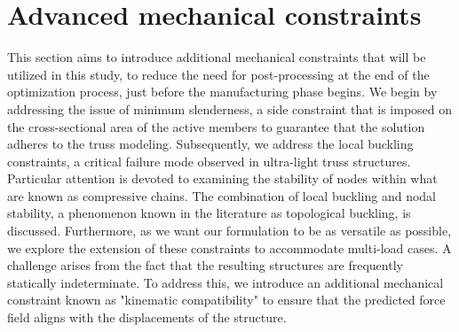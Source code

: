 \section{Advanced mechanical constraints} \label{sec:04_constr}
This section aims to introduce additional mechanical constraints that will be utilized in this study, to reduce the need for post-processing at the end of the optimization process, just before the manufacturing phase begins. We begin by addressing the issue of minimum slenderness, a side constraint that is imposed on the cross-sectional area of the active members to guarantee that the solution adheres to the truss modeling. Subsequently, we address the local buckling constraints, a critical failure mode observed in ultra-light truss structures. Particular attention is devoted to examining the stability of nodes within what are known as compressive chains. The combination of local buckling and nodal stability, a phenomenon known in the literature as topological buckling, is discussed. Furthermore, as we want our formulation to be as versatile as possible, we explore the extension of these constraints to accommodate multi-load cases. A challenge arises from the fact that the resulting structures are frequently statically indeterminate. To address this, we introduce an additional mechanical constraint known as "kinematic compatibility" to ensure that the predicted force field aligns with the displacements of the structure.

